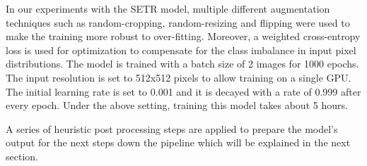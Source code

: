 \documentclass[letterpaper]{article} %
\begin{document}

In our experiments with the SETR model, multiple different augmentation techniques such as random-cropping, random-resizing and flipping were used to make the training more robust to over-fitting. Moreover, 
a weighted cross-entropy loss is used for optimization to compensate for the class imbalance in input pixel distributions.
The model is trained with a batch size of 2 images for 1000 epochs. The input resolution is set to 512x512 pixels to allow training on a single GPU. The initial learning rate is set to 0.001 and it is decayed with a rate of 0.999 after every epoch. Under the above setting, training this model takes about 5 hours.

A series of heuristic post processing steps are applied to prepare the model's output for the next steps down the pipeline which will be explained in the next section.
\end{document}
